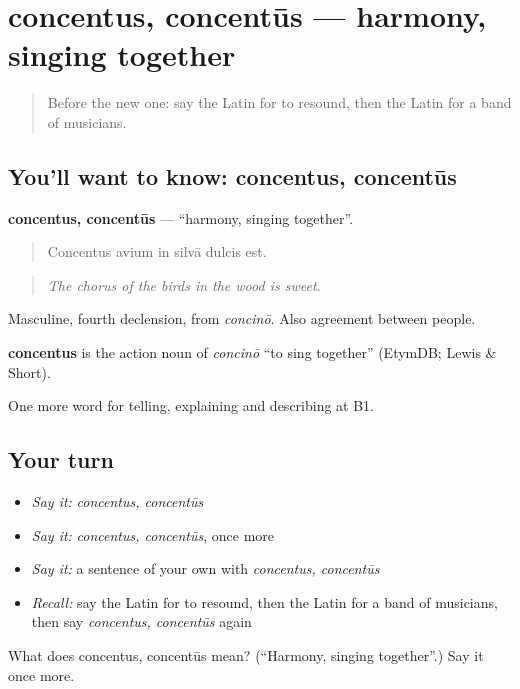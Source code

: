 \section[concentus, concentūs]{concentus, concentūs — harmony, singing together}

\label{lesson:LA-C545-concentus}



\begin{quote}
Before the new one: say the Latin for to resound, then the Latin for a band of musicians.
\end{quote}

\subsection*{You'll want to know: concentus, concentūs}
\textbf{concentus, concentūs} — \textquotedblleft{}harmony, singing together\textquotedblright{}.

\begin{quote}
Concentus avium in silvā dulcis est.
\end{quote}

\begin{quote}
\emph{The chorus of the birds in the wood is sweet.}
\end{quote}

Masculine, fourth declension, from \emph{concinō}. Also agreement between people.

\begin{cousinweb}
\textbf{concentus} is the action noun of \emph{concinō} \textquotedblleft{}to sing together\textquotedblright{} (EtymDB; Lewis \& Short).
\end{cousinweb}

\begin{grammarlens}[title={What you've built}]
One more word for telling, explaining and describing at B1.
\end{grammarlens}

\subsection*{Your turn}
\begin{itemize}
\raggedright
  \item \emph{Say it:} \emph{concentus, concentūs}
  \item \emph{Say it:} \emph{concentus, concentūs}, once more
  \item \emph{Say it:} a sentence of your own with \emph{concentus, concentūs}
  \item \emph{Recall:} say the Latin for to resound, then the Latin for a band of musicians, then say \emph{concentus, concentūs} again
\end{itemize}

\begin{tcolorbox}[breakable,colback=teal!4,colframe=teal!35!black,title={Before you move on}]
What does concentus, concentūs mean? (\textquotedblleft{}Harmony, singing together\textquotedblright{}.) Say it once more.
\end{tcolorbox}
